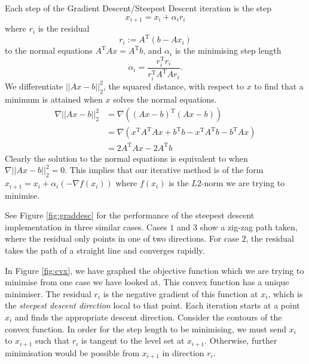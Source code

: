 \documentclass{article}
\begin{document}
Each step of the Gradient Descent/Steepest Descent iteration is the step
\begin{equation*}
    x_{i+1} = x_i + \alpha_i r_i
\end{equation*}
where $r_i$ is the residual
\begin{equation*}
    r_i := A^\mathrm{T} \left(b - Ax_i\right)
\end{equation*}
to the normal equations $A^\mathrm{T} A x = A^\mathrm{T} b$,
and $\alpha_i$ is the minimising step length
\begin{equation*}
	\alpha_i = \frac{r_i^\mathrm{T}r_i}{r_i^\mathrm{T}A^\mathrm{T} A r_i}.
\end{equation*}
We differentiate $||Ax-b||_2^2$, the squared distance, with respect to $x$ to find that a minimum is attained when $x$ solves the normal equations.
\begin{align*}
    \nabla ||Ax-b||_2^2 &= \nabla \left(
        (Ax-b)^\mathrm{T} (Ax-b)
    \right) \\
    &= \nabla \left(
        x^\mathrm{T} A^\mathrm{T} A x + b^\mathrm{T}b - x^\mathrm{T} A^\mathrm{T}b - b^\mathrm{T} Ax
    \right) \\
    &= 2A^\mathrm{T}Ax - 2A^\mathrm{T}b
\end{align*}
Clearly the solution to the normal equations is equivalent to when $\nabla ||Ax-b||_2^2 = 0$.
This implies that our iterative method is of the form $x_{i+1} = x_i + \alpha_i \left( -\nabla f(x_i) \right)$ where $f(x_i)$ is the $L2$-norm we are trying to minimise.

See Figure \ref{fig:graddesc} for the performance of the steepest descent implementation in three similar cases.
Cases $1$ and $3$ show a zig-zag path taken, where the residual only points in one of two directions.
For case $2$, the residual takes the path of a straight line and converges rapidly.

In Figure \ref{fig:cvx}, we have graphed the objective function which we are trying to minimise from one case we have looked at.
This convex function has a unique minimiser.
The residual $r_i$ is the negative gradient of this function at $x_i$,
which is the \textit{steepest descent direction} local to that point.
Each iteration starts at a point $x_i$ and finds the appropriate descent direction.
Consider the contours of the convex function.
In order for the step length to be minimising, we must send $x_i$ to $x_{i+1}$ such that $r_i$ is tangent to the level set at $x_{i+1}$.
Otherwise, further minimisation would be possible from $x_{i+1}$ in direction $r_i$.
\end{document}
